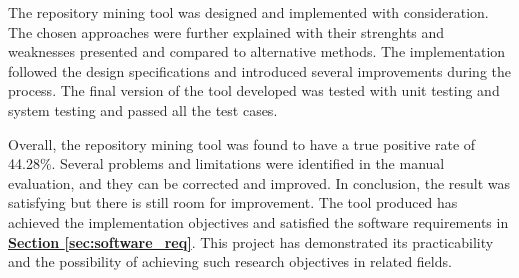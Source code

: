 \documentclass[12pt, a4paper]{report}
\begin{document}
The repository mining tool was designed and implemented with consideration. The chosen approaches
were further explained with their strenghts and weaknesses presented and compared to alternative
methods. The implementation followed the design specifications and introduced several improvements
during the process. The final version of the tool developed was tested with unit testing and system
testing and passed all the test cases.

Overall, the repository mining tool was found to have a true positive rate of 44.28\%. Several
problems and limitations were identified in the manual evaluation, and they can be corrected and
improved. In conclusion, the result was satisfying but there is still room for improvement. The tool
produced has achieved the implementation objectives and satisfied the software requirements in
\hyperref[sec:software_req]{\textbf{Section \ref*{sec:software_req}}}. This project has demonstrated
its practicability and the possibility of achieving such research objectives in related fields.

\printglossary[type=\acronymtype]
\printbibliography[heading=bibintoc]


\end{document}
